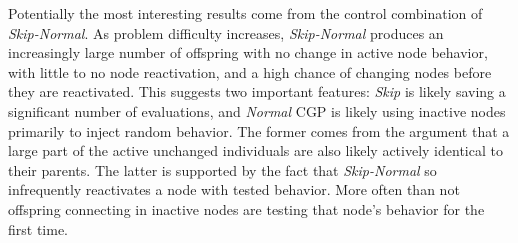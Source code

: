 \documentclass[journal]{IEEEtran}
\begin{document}
Potentially the most interesting results come from the control combination of
\emph{Skip-Normal}.  As problem difficulty increases, \emph{Skip-Normal} produces
an increasingly large number of offspring with no change in active node behavior,
with little to no node reactivation, and a high chance of changing nodes before
they are reactivated.  This suggests two important features: \emph{Skip} is likely
saving a significant number of evaluations, and \emph{Normal} CGP is likely using
inactive nodes primarily to inject random behavior.  The former comes from the
argument that a large part of the active unchanged individuals are also likely
actively identical to their parents.  The latter is supported by the fact that
\emph{Skip-Normal} so infrequently reactivates a node with tested behavior.  More
often than not offspring connecting in inactive nodes are testing that node's behavior
for the first time.

%
%



%
%
\end{document}
